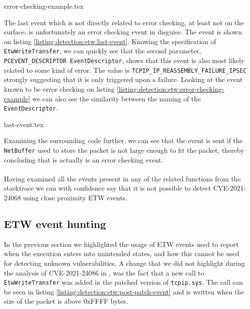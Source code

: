 \documentclass{report}
\begin{document}
{error-checking-example.tex}

The last event which is not directly related to error checking, at least not on the surface, is unfortunately an error checking event in disguise. The event is shown on listing \ref{listing:detection:etw:last-event}. Knowing the specification of \texttt{EtwWriteTransfer}\cite{url:etw:etwwritetransfer-api}, we can quickly see that the second parameter, \texttt{PCEVENT_DESCRIPTOR EventDescriptor}, shows that this event is also most likely related to some kind of error\cite{url:etw:etwwritetransfer-api}. The value is \texttt{TCPIP_IP_REASSEMBLY_FAILURE_IPSEC}\cite{url:etw:etw-event-descriptor} strongly suggesting that it is only triggered upon a failure. Looking at the event known to be error checking on listing \ref{listing:detection:etw:error-checking-example} we can also see the similarity between the naming of the \texttt{EventDescriptor}.

{last-event.tex}

Examining the surrounding code further, we can see that the event is sent if the \texttt{NetBuffer} used to store the packet is not large enough to fit the packet, thereby concluding that is actually is an error checking event.
\\
\\
Having examined all the events present in any of the related functions from the stacktrace we can with confidence say that it is not possible to detect CVE-2021-24068 using close proximity \gls{ETW} events.


\subsection{\gls{ETW} event hunting}
In the previous section we highlighted the usage of \gls{ETW} events used to report when the execution enters into unintended states, and how this cannot be used for detecting unknown vulnerabilities. A change that we did not highlight during the analysis of CVE-2021-24086 in , was the fact that a new call to \texttt{EtwWriteTransfer} was added in the patched version of \texttt{tcpip.sys}. The call can be seen in listing \ref{listing:detection:etw:post-patch-event} and is written when the size of the packet is above 0xFFFF bytes.
\end{document}
